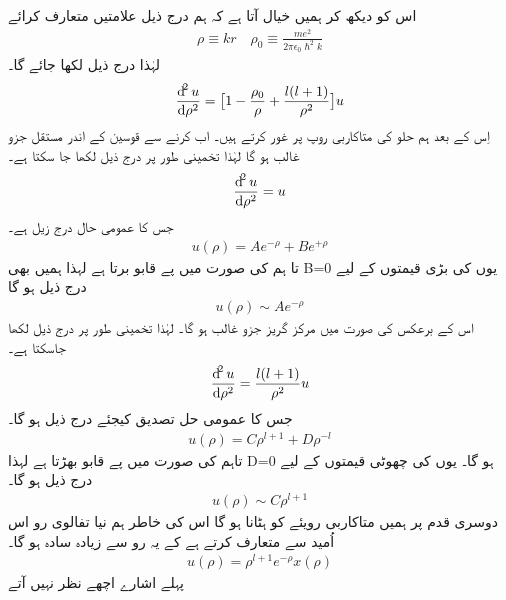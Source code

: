 اس کو دیکھ کر ہمیں خیال آتا ہے کہ ہم درج ذیل علامتیں متعارف کرائے 
\begin{align}
\rho\equiv kr \quad \rho_{0}\equiv\frac{me^{2}}{2\pi\epsilon_{0}\hslash^{2}k} 
\end{align}
لہٰذا درج ذیل لکھا جائے گا۔
\begin{align}
\frac{\dif^{2}{u}}{\dif{\rho^{2}}}=\big[1-\frac{\rho_{0}}{\rho}+\frac{l(l+1)}{\rho^{2}}\big]u 
\end{align}
اِس کے بعد ہم حلو کی متاکاربی روپ پر غور کرتے ہیں۔ اب
کرنے سے قوسین کے اندر مستقل جزو غالب ہو گا لہٰذا تخمینی طور پر درج ذیل لکھا جا سکتا ہے۔
\begin{align}
\frac{\dif^{2}{u}}{\dif{\rho^{2}}}=u 
\end{align}
جس کا عمومی حال درج زیل ہے۔
\begin{align}
u(\rho)=Ae^{-\rho}+Be^{+\rho} 
\end{align}
تا ہم 
کی صورت میں 
پے قابو برتا ہے لہذا ہمیں بھی
B=0
یوں 
کی بڑی قیمتوں کے لیے درج  ذیل ہو گا 
\begin{align}
u(\rho)\sim Ae^{-\rho} 
\end{align}
اس کے برعکس 
کی صورت میں مرکز گریز جزو غالب ہو گا۔ لہٰذا تخمينی طور پر درج ذیل لکھا جاسکتا ہے۔ 
\begin{align}
\frac{\dif^{2}{u}}{\dif{\rho^{2}}}=\frac{l(l+1)}{\rho^{2}}u 
\end{align}
 جس کا عمومی حل تصدیق کیجئے درج ذیل ہو گا۔
 \begin{align}
u(\rho)=C\rho^{l+1}+D\rho^{-l} 
\end{align}
 تاہم
 کی صورت میں
 پے قابو بھڑتا ہے لہذا
 D=0
 ہو گا۔
 یوں 
 کی چھوٹی قیمتوں کے لیے درج ذیل ہو گا۔
 \begin{align}
u(\rho)\sim C\rho^{l+1} 
\end{align}
  دوسری قدم پر ہمیں متاکاربی رویئے کو ہٹانا ہو گا اس کی خاطر ہم نیا تفالوی رو اس اُمید سے متعارف کرتے ہے کے یہ
    رو سے زیادہ سادہ ہو گا۔
  \begin{align}
u(\rho)=\rho^{l+1}e^{-\rho}x(\rho) 
\end{align}
  پہلے اشارے اچھے نظر نہیں آتے

